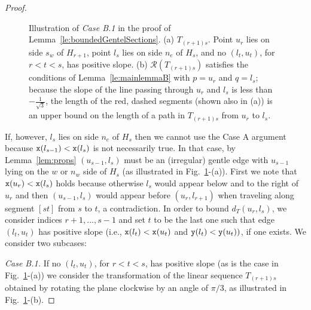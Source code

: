 \begin{proof}
\begin{figure}
\center{\caseB}
\vspace{-1.2cm}

\caption{Illustration of {\em Case B.1} in the proof of 
Lemma~\ref{le:boundedGentelSections}. (a) $T_{(r+1)s}$. Point $u_r$ lies on side 
$s_w$ of $H_{r+1}$, point $l_s$ lies on side $n_e$ of $H_s$, and no
$(l_t, u_t)$, for $r < t < s$, has positive slope. (b) $\mathcal{R}(T_{(r+1)s})$
satisfies the conditions of Lemma~\ref{le:mainlemmaB} with $p = u_r$ and
$q = l_s$; because the slope of the line passing through $u_r$ and $l_s$ is less
than $-\frac{1}{\sqrt{3}}$, the length of the red, dashed segments (shown also in (a))
 is an upper bound on the length of a path in $T_{(r+1)s}$ from $u_r$ to $l_s$.}
\label{fig:caseB}
\end{figure}

If, however, $l_s$ lies on side $n_e$ of $H_s$ then we cannot use the Case A
argument because ${\tt x}(l_{s-1}) < {\tt x}(l_s)$ is not necessarily true.
In that case, by Lemma~\ref{lem:props} $(u_{s-1},l_s)$ must be an
(irregular) gentle edge with $u_{s-1}$ lying on the $w$ or $n_w$ side of $H_s$
(as illustrated in 
Fig.~\ref{fig:caseB}-(a)). First we note that ${\tt x}(u_r) < {\tt x}(l_s)$
holds because otherwise $l_s$ would appear below and to the right of $u_r$ and
then $(u_{s-1},l_s)$ would appear before $(u_r,l_{r+1})$
when traveling along segment $[st]$ from $s$ to $t$, a contradiction.
In order to bound $d_T(u_r,l_s)$, 
we consider indices $r+1,...,s-1$ and set $t$ to be
the last one such that edge $(l_t,u_t)$ has positive slope 
(i.e., ${\tt x}(l_t) < {\tt x}(u_t)$ and ${\tt y}(l_t) < {\tt y}(u_t))$, 
if one exists. We consider two subcases:



{\em Case B.1.} If no $(l_t, u_t)$, for $r < t < s$,
has positive slope  (as is the case in Fig.~\ref{fig:caseB}-(a)) we consider
the transformation of the linear sequence 
$T_{(r+1)s}$ obtained by rotating the plane clockwise by
an angle of $\pi/3$, %
as illustrated in Fig.~\ref{fig:caseB}-(b). 



\end{proof}
